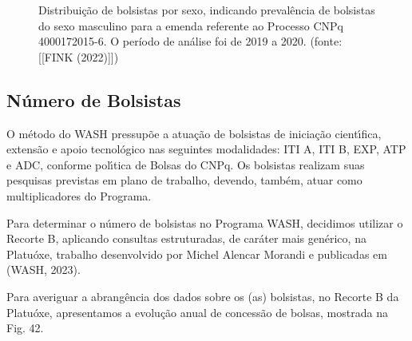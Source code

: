 \documentclass[
12pt,		%
openright,	%
twoside,  %
a4paper,			%
chapter=TITLE,		%
english,			%
french,				%
spanish,			%
brazil				%
]{USPSC-classe/USPSC}
\begin{document}
\begin{figure}[max size={\textwidth}{\textheight}]
\begin{minipage}[b]{0.4\linewidth}
                \caption{Distribui\c{c}\~ao de bolsistas por sexo, indicando preval\^encia de bolsistas do sexo masculino para a emenda referente ao Processo CNPq 4000172015-6. O per\'{i}odo de an\'alise foi de 2019 a 2020. (fonte: [[FINK (2022)]])}
                \label{1164a3115bd14e3f25b6b141840652ffbd0d2374}
\end{minipage}
\hspace{0.5cm}
\end{figure}



\subsection[N\'umero de Bolsistas]{N\'umero de Bolsistas}\label{N\'umero de Bolsistas}
O m\'etodo do WASH pressup\~oe a atua\c{c}\~ao de bolsistas de inicia\c{c}\~ao cient\'{\i}fica, extens\~ao e apoio tecnol\'ogico nas seguintes modalidades: ITI A, ITI B, EXP, ATP e ADC, conforme pol\'{\i}tica de Bolsas do CNPq. Os bolsistas realizam suas pesquisas previstas em plano de trabalho, devendo, tamb\'em, atuar como multiplicadores do Programa.









Para determinar o n\'umero de bolsistas no Programa WASH, decidimos utilizar o Recorte B, aplicando consultas estruturadas, de car\'ater mais gen\'erico, na Platu\'oxe, trabalho desenvolvido por Michel Alencar Morandi e publicadas em (WASH, 2023).









Para averiguar a abrang\^encia dos dados sobre os (as) bolsistas, no Recorte B da Platu\'oxe, apresentamos a evolu\c{c}\~ao anual de concess\~ao de bolsas, mostrada na Fig. 42.
\end{document}
